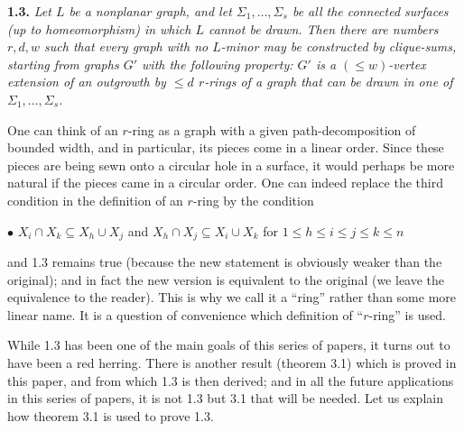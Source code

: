 \textbf{1.3.} \textit{Let $L$ be a nonplanar graph, and let $\Sigma_1, \dots, \Sigma_s$ be all the connected surfaces (up to homeomorphism) in which $L$ cannot be drawn. Then there are numbers $r, d, w$ such that every graph with no $L$-minor may be constructed by clique-sums, starting from graphs $G'$ with the following property: $G'$ is a $(\le w)$-vertex extension of an outgrowth by $\le d$ $r$-rings of a graph that can be drawn in one of $\Sigma_1, \dots, \Sigma_s$.}

One can think of an $r$-ring as a graph with a given path-decomposition of bounded width, and in particular, its pieces come in a linear order. Since these pieces are being sewn onto a circular hole in a surface, it would perhaps be more natural if the pieces came in a circular order. One can indeed replace the third condition in the definition of an $r$-ring by the condition

\hspace*{12pt}$\bullet$ $X_i \cap X_k \subseteq X_h \cup X_j$ and $X_h \cap X_j \subseteq X_i \cup X_k$ for $1 \le h \le i \le j \le k \le n$

and 1.3 remains true (because the new statement is obviously weaker than the original); and in fact the new version is equivalent to the original (we leave the equivalence to the reader). This is why we call it a ``ring'' rather than some more linear name. It is a question of convenience which definition of ``$r$-ring'' is used.

While 1.3 has been one of the main goals of this series of papers, it turns out to have been a red herring. There is another result (theorem 3.1) which is proved in this paper, and from which 1.3 is then derived; and in all the future applications in this series of papers, it is not 1.3 but 3.1 that will be needed. Let us explain how theorem 3.1 is used to prove 1.3.

